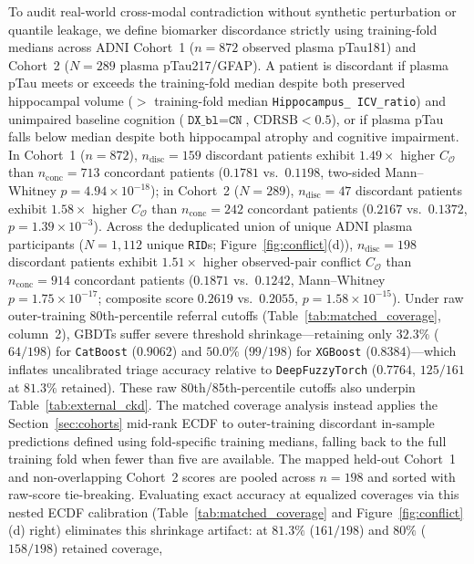 \documentclass[10pt,twocolumn]{article}
\begin{document}
To audit real-world cross-modal contradiction without synthetic perturbation or quantile
leakage, we define biomarker discordance strictly using training-fold medians across ADNI
Cohort~1 ($n=872$ observed plasma pTau181) and Cohort~2 ($N=289$ plasma pTau217/GFAP). A
patient is discordant if plasma pTau meets or exceeds the training-fold median despite both
preserved hippocampal volume ($>$ training-fold median \texttt{Hippocampus\_\allowbreak
ICV\_\allowbreak ratio}) and unimpaired baseline cognition ($\texttt{DX\_bl}=\texttt{CN}$,
$\text{CDRSB}<0.5$), or if plasma pTau falls below median despite both hippocampal atrophy and
cognitive impairment. In Cohort~1 ($n=872$), $n_{\text{disc}}=159$ discordant patients exhibit
$1.49\times$ higher $C_{\mathcal{O}}$ than $n_{\text{conc}}=713$ concordant patients ($0.1781$
vs.\ $0.1198$, two-sided Mann--Whitney $p = 4.94 \times 10^{-18}$); in Cohort~2 ($N=289$),
$n_{\text{disc}}=47$ discordant patients exhibit $1.58\times$ higher $C_{\mathcal{O}}$ than
$n_{\text{conc}}=242$ concordant patients ($0.2167$ vs.\ $0.1372$, $p = 1.39 \times 10^{-3}$).
Across the deduplicated union of unique ADNI plasma participants ($N=1,112$ unique
\texttt{RID}s; Figure~\ref{fig:conflict}(d)), $n_{\text{disc}}=198$ discordant patients exhibit
$1.51\times$ higher observed-pair conflict $C_{\mathcal{O}}$ than $n_{\text{conc}}=914$
concordant patients ($0.1871$ vs.\ $0.1242$, Mann--Whitney $p = 1.75 \times 10^{-17}$;
composite score $0.2619$ vs.\ $0.2055$, $p = 1.58 \times 10^{-15}$). Under raw outer-training
80th-percentile referral cutoffs (Table~\ref{tab:matched_coverage}, column~2), GBDTs suffer
severe threshold shrinkage---retaining only $32.3\%$ ($64/198$) for \texttt{CatBoost}
($0.9062$)
and $50.0\%$ ($99/198$) for \texttt{XGBoost} ($0.8384$)---which inflates uncalibrated triage
accuracy relative to \texttt{DeepFuzzyTorch} ($0.7764$, $125/161$ at $81.3\%$ retained).
These raw 80th/85th-percentile cutoffs also underpin Table~\ref{tab:external_ckd}. The matched
coverage analysis instead applies the Section~\ref{sec:cohorts} mid-rank ECDF to
outer-training discordant in-sample predictions defined using fold-specific training medians,
falling back to the full
training fold when fewer than five are available. The mapped held-out Cohort~1 and
non-overlapping Cohort~2 scores are pooled across $n=198$ and sorted with raw-score
tie-breaking. Evaluating exact accuracy at equalized coverages via this nested ECDF calibration
(Table~\ref{tab:matched_coverage} and Figure~\ref{fig:conflict}(d) right) eliminates this
shrinkage artifact: at $81.3\%$ ($161/198$) and $80\%$ ($158/198$) retained coverage,
\end{document}
